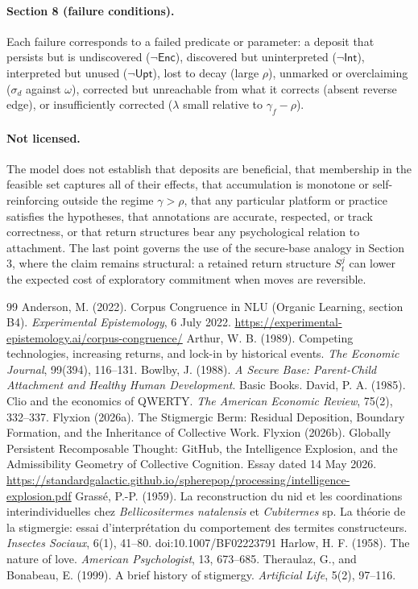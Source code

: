\documentclass[11pt]{article}
\theoremstyle{definition}
\theoremstyle{remark}
\newcommand{\Enc}{\mathsf{Enc}}
\newcommand{\Int}{\mathsf{Int}}
\newcommand{\Upt}{\mathsf{Upt}}
\begin{document}
\paragraph{Section 8 (failure conditions).} Each failure corresponds to a failed predicate or parameter: a deposit that persists but is undiscovered ($\neg\Enc$), discovered but uninterpreted ($\neg\Int$), interpreted but unused ($\neg\Upt$), lost to decay (large $\rho$), unmarked or overclaiming ($\sigma_d$ against $\omega$), corrected but unreachable from what it corrects (absent reverse edge), or insufficiently corrected ($\lambda$ small relative to $\gamma_f-\rho$).

\paragraph{Not licensed.} The model does not establish that deposits are beneficial, that membership in the feasible set captures all of their effects, that accumulation is monotone or self-reinforcing outside the regime $\gamma>\rho$, that any particular platform or practice satisfies the hypotheses, that annotations are accurate, respected, or track correctness, or that return structures bear any psychological relation to attachment. The last point governs the use of the secure-base analogy in Section 3, where the claim remains structural: a retained return structure $S_t^j$ can lower the expected cost of exploratory commitment when moves are reversible.

\begin{thebibliography}{99}
 Anderson, M. (2022). Corpus Congruence in NLU (Organic Learning, section B4). \emph{Experimental Epistemology}, 6 July 2022. \url{https://experimental-epistemology.ai/corpus-congruence/}
 Arthur, W. B. (1989). Competing technologies, increasing returns, and lock-in by historical events. \emph{The Economic Journal}, 99(394), 116--131.
 Bowlby, J. (1988). \emph{A Secure Base: Parent-Child Attachment and Healthy Human Development}. Basic Books.
 David, P. A. (1985). Clio and the economics of QWERTY. \emph{The American Economic Review}, 75(2), 332--337.
 Flyxion (2026a). The Stigmergic Berm: Residual Deposition, Boundary Formation, and the Inheritance of Collective Work.
 Flyxion (2026b). Globally Persistent Recomposable Thought: GitHub, the Intelligence Explosion, and the Admissibility Geometry of Collective Cognition. Essay dated 14 May 2026. \url{https://standardgalactic.github.io/spherepop/processing/intelligence-explosion.pdf}
 Grass\'e, P.-P. (1959). La reconstruction du nid et les coordinations interindividuelles chez \emph{Bellicositermes natalensis} et \emph{Cubitermes} sp. La th\'eorie de la stigmergie: essai d'interpr\'etation du comportement des termites constructeurs. \emph{Insectes Sociaux}, 6(1), 41--80. doi:10.1007/BF02223791
 Harlow, H. F. (1958). The nature of love. \emph{American Psychologist}, 13, 673--685.
 Theraulaz, G., and Bonabeau, E. (1999). A brief history of stigmergy. \emph{Artificial Life}, 5(2), 97--116.
\end{thebibliography}
\end{document}
